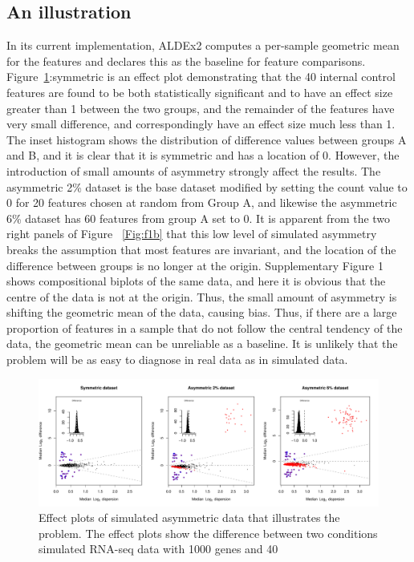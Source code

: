 \documentclass [10pt]{article}
\begin{document}
\subsection{An illustration}
\vskip-0.25cm
In its current implementation, ALDEx2 computes a per-sample geometric mean for the features and declares this as the baseline for feature comparisons. Figure~\ref{Fig:f1a}:symmetric is an effect plot demonstrating that the 40 internal control features are found to be both statistically significant and to have an effect size greater than 1 between the two groups, and the remainder of the features have very small difference, and correspondingly have an effect size much less than 1. The inset histogram shows the distribution of difference values between groups A and B, and it is clear that it is symmetric and has a location of 0. However, the introduction of small amounts of asymmetry strongly affect the results. The asymmetric 2\% dataset is the base dataset modified by setting the count value to 0 for 20 features chosen at random from Group A, and likewise the asymmetric 6\% dataset has 60 features from group A set to 0. It is apparent from the two right panels of Figure ~\ref{Fig:f1b} that this low level of simulated asymmetry breaks the assumption that most features are invariant, and the location of the difference between groups is no longer at the origin. Supplementary Figure 1 shows compositional biplots of the same data, and here it is obvious that the centre of the data is not at the origin. Thus, the small amount of asymmetry is shifting the geometric mean of the data, causing bias. Thus, if there are a large proportion of features in a sample that do not follow the central tendency of the data, the geometric mean can be unreliable as a baseline. It is unlikely that the problem will be as easy to diagnose in real data as in simulated data. 

\begin{figure}[ht]
\includegraphics[width=6in]{../figures/Fig_1.pdf}
\vspace{3mm} \caption{Effect plots of simulated asymmetric data that illustrates the problem. The effect plots show the difference between two conditions simulated RNA-seq data with 1000 genes and 40   }
\label{Fig:f1a}
\end{figure}
\end{document}
